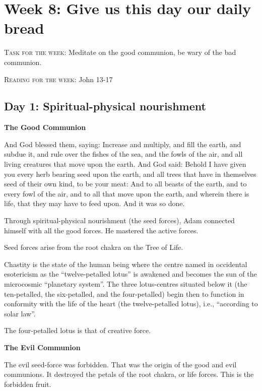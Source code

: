\chapter{Week 8: Give us this day our daily bread}

\textsc{Task for the week}: Meditate on the good communion, be wary of the bad communion.

\textsc{Reading for the week}: John 13-17

\section{Day 1: Spiritual-physical nourishment}
\textbf{The Good Communion}

And God blessed them, saying: Increase and multiply, and fill the earth, and subdue it, and rule over the fishes of the sea, and the fowls of the air, and all living creatures that move upon the earth. And God said: Behold I have given you every herb bearing seed upon the earth, and all trees that have in themselves seed of their own kind, to be your meat: And to all beasts of the earth, and to every fowl of the air, and to all that move upon the earth, and wherein there is life, that they may have to feed upon. And it was so done. 


Through spiritual-physical nourishment (the seed forces), Adam connected himself with all the good forces. He mastered the active forces.

Seed forces arise from the root chakra on the Tree of Life.

\begin{quotex}
Chastity is the state of the human being where the centre named in occidental esotericism as the ``twelve-petalled lotus'' is awakened and becomes the sun of the microcosmic ``planetary system''. The three lotus-centres situated below it (the ten-petalled, the six-petalled, and the four-petalled) begin then to function in conformity with the life of the heart (the twelve-petalled lotus), i.e., ``according to solar law''. 

\end{quotex}

The four-petalled lotus is that of creative force.

\textbf{The Evil Communion}

The evil seed-force was forbidden. That was the origin of the good and evil communions. It destroyed the petals of the root chakra, or life forces. This is the forbidden fruit.

